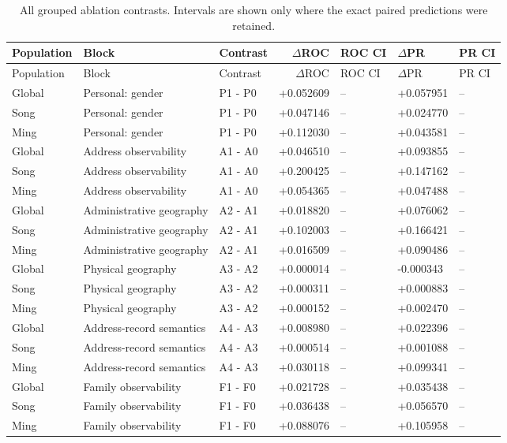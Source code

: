 \begin{longtable}{lllrlll}
\caption{All grouped ablation contrasts. Intervals are shown only where the exact paired predictions were retained.}\label{tab:app-ablation}\\
\toprule
Population & Block & Contrast & $\Delta$ROC & ROC CI & $\Delta$PR & PR CI \\
\midrule
\endfirsthead
\toprule
Population & Block & Contrast & $\Delta$ROC & ROC CI & $\Delta$PR & PR CI \\
\midrule
\endhead
Global & Personal: gender & P1 - P0 & +0.052609 & -- & +0.057951 & -- \\
Song & Personal: gender & P1 - P0 & +0.047146 & -- & +0.024770 & -- \\
Ming & Personal: gender & P1 - P0 & +0.112030 & -- & +0.043581 & -- \\
Global & Address observability & A1 - A0 & +0.046510 & -- & +0.093855 & -- \\
Song & Address observability & A1 - A0 & +0.200425 & -- & +0.147162 & -- \\
Ming & Address observability & A1 - A0 & +0.054365 & -- & +0.047488 & -- \\
Global & Administrative geography & A2 - A1 & +0.018820 & -- & +0.076062 & -- \\
Song & Administrative geography & A2 - A1 & +0.102003 & -- & +0.166421 & -- \\
Ming & Administrative geography & A2 - A1 & +0.016509 & -- & +0.090486 & -- \\
Global & Physical geography & A3 - A2 & +0.000014 & -- & -0.000343 & -- \\
Song & Physical geography & A3 - A2 & +0.000311 & -- & +0.000883 & -- \\
Ming & Physical geography & A3 - A2 & +0.000152 & -- & +0.002470 & -- \\
Global & Address-record semantics & A4 - A3 & +0.008980 & -- & +0.022396 & -- \\
Song & Address-record semantics & A4 - A3 & +0.000514 & -- & +0.001088 & -- \\
Ming & Address-record semantics & A4 - A3 & +0.030118 & -- & +0.099341 & -- \\
Global & Family observability & F1 - F0 & +0.021728 & -- & +0.035438 & -- \\
Song & Family observability & F1 - F0 & +0.036438 & -- & +0.056570 & -- \\
Ming & Family observability & F1 - F0 & +0.088076 & -- & +0.105958 & -- \\

\end{longtable}
